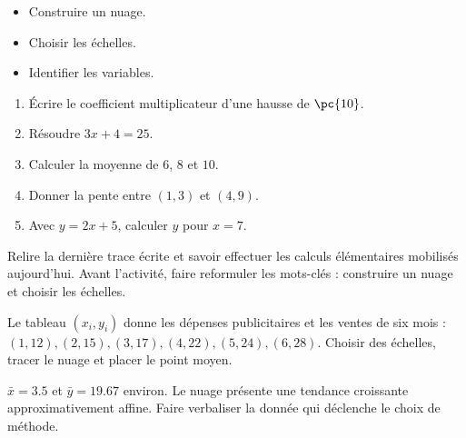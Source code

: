 \begin{objectives}\begin{itemize}\item Construire un nuage.\item Choisir les échelles.\item Identifier les variables.\end{itemize}\end{objectives}
\begin{fluency}\begin{enumerate}\item Écrire le coefficient multiplicateur d'une hausse de $\pc{10}$. \item Résoudre $3x+4=25$. \item Calculer la moyenne de $6$, $8$ et $10$. \item Donner la pente entre $(1,3)$ et $(4,9)$. \item Avec $y=2x+5$, calculer $y$ pour $x=7$. \end{enumerate}\end{fluency}
\begin{prerequisites}Relire la dernière trace écrite et savoir effectuer les calculs élémentaires mobilisés aujourd'hui. Avant l'activité, faire reformuler les mots-clés : construire un nuage et choisir les échelles.\end{prerequisites}

\begin{activity}
Le tableau $(x_i,y_i)$ donne les dépenses publicitaires et les ventes de six mois : $(1,12),(2,15),(3,17),(4,22),(5,24),(6,28)$. Choisir des échelles, tracer le nuage et placer le point moyen.
\begin{center}\end{center}
\end{activity}
\begin{solution}$\bar x=\num{3,5}$ et $\bar y=\num{19,67}$ environ. Le nuage présente une tendance croissante approximativement affine. Faire verbaliser la donnée qui déclenche le choix de méthode.\end{solution}

